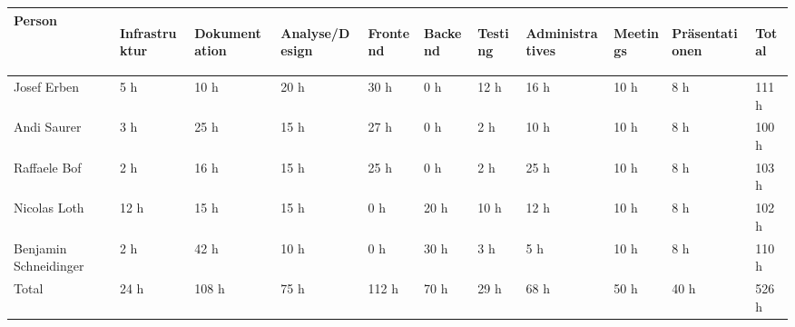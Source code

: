 \begin{longtabu} to \textwidth { | X[l] | l | l | l | l | l | l | l | l | l | l | }
\hline
\textbf{Person} & \begin{turn}{90}\textbf{Infrastruktur}\end{turn} & \begin{turn}{90}\textbf{Dokumentation}\end{turn} & \begin{turn}{90}\textbf{Analyse/Design}\end{turn} & \begin{turn}{90}\textbf{Frontend}\end{turn} & \begin{turn}{90}\textbf{Backend}\end{turn} & \begin{turn}{90}\textbf{Testing}\end{turn} & \begin{turn}{90}\textbf{Administratives}\end{turn} & \begin{turn}{90}\textbf{Meetings}\end{turn} & \begin{turn}{90}\textbf{Präsentationen}\end{turn} & \begin{turn}{90}\textbf{Total}\end{turn} \\\hline
\endhead

Josef Erben &	5 h &	10 h &	20 h &	30 h &	0 h &	12 h &	16 h &	10 h &	8 h &	111 h \\\hline
Andi Saurer &	3 h &	25 h &	15 h &	27 h &	0 h &	2 h &	10 h &	10 h &	8 h &	100 h \\\hline
Raffaele Bof &	2 h &	16 h &	15 h &	25 h &	0 h &	2 h &	25 h &	10 h &	8 h &	103 h \\\hline
Nicolas Loth &	12 h &	15 h &	15 h &	0 h &	20 h &	10 h &	12 h &	10 h &	8 h &	102 h \\\hline
Benjamin Schneidinger &	2 h &	42 h &	10 h &	0 h &	30 h &	3 h &	5 h &	10 h &	8 h &	110 h \\\hline
Total &	24 h &	108 h &	75 h &	112 h &	70 h &	29 h &	68 h &	50 h &	40 h &	526 h \\\hline

\end{longtabu}

